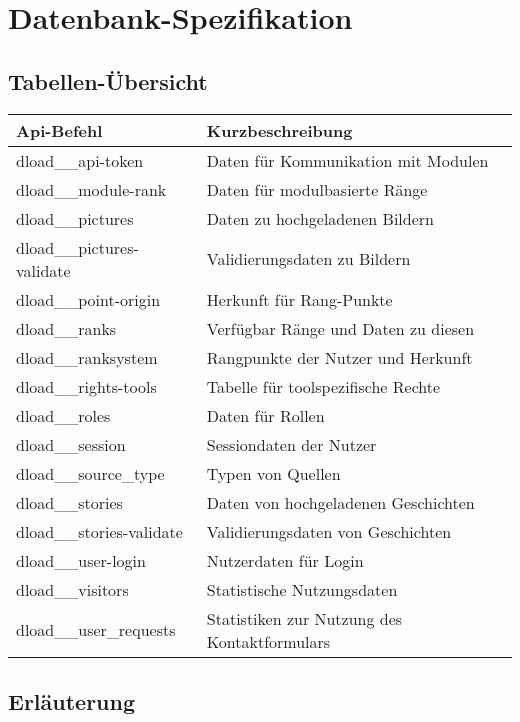 \chapter{Datenbank-Spezifikation}
\section{Tabellen-Übersicht}
\begin{longtable}[H]{|l|p{9cm}|}
	\hline
	\textbf{Api-Befehl} 	   & \textbf{Kurzbeschreibung}              \\ \hline
	dload\_\_api-token         & Daten für Kommunikation mit Modulen    \\ \hline
	dload\_\_module-rank       & Daten für modulbasierte Ränge          \\ \hline
	dload\_\_pictures          & Daten zu hochgeladenen Bildern         \\ \hline
	dload\_\_pictures-validate & Validierungsdaten zu Bildern           \\ \hline
	dload\_\_point-origin      & Herkunft für Rang-Punkte               \\ \hline
	dload\_\_ranks             & Verfügbar Ränge und Daten zu diesen    \\ \hline
	dload\_\_ranksystem        & Rangpunkte der Nutzer und Herkunft     \\ \hline
	dload\_\_rights-tools      & Tabelle für toolspezifische Rechte     \\ \hline
	dload\_\_roles             & Daten für Rollen                       \\ \hline
	dload\_\_session           & Sessiondaten der Nutzer                \\ \hline
	dload\_\_source\_type      & Typen von Quellen                      \\ \hline
	dload\_\_stories           & Daten von hochgeladenen Geschichten    \\ \hline
	dload\_\_stories-validate  & Validierungsdaten von Geschichten      \\ \hline
	dload\_\_user-login        & Nutzerdaten für Login                  \\ \hline
	dload\_\_visitors          & Statistische Nutzungsdaten             \\ \hline
	dload\_\_user\_requests    & Statistiken zur Nutzung des Kontaktformulars \\ \hline
\end{longtable}
\newpage
\section{Erläuterung}
